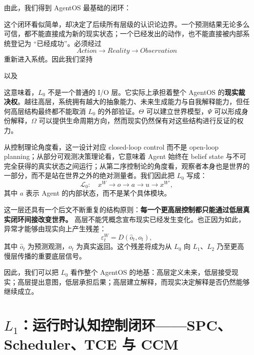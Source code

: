由此，我们得到 AgentOS 最基础的闭环：
\begin{statementbox}
\centering
{}
\end{statementbox}

这个闭环看似简单，却决定了后续所有层级的认识论边界。一个预测结果无论多么可信，都不能直接成为新的现实状态；一个已经发出的动作，也不能直接被内部系统登记为 ``已经成功''。必须经过
\[
Action
\rightarrow
Reality
\rightarrow
Observation
\]
重新进入系统。因此我们坚持
\begin{statementbox}
\centering
{}
\end{statementbox}
以及
\begin{statementbox}
\centering
{}
\end{statementbox}

这意味着，$L_0$ 不是一个普通的 I/O 层。它实际上承担着整个 AgentOS 的\textbf{现实裁决权}。越往高层，系统拥有越大的抽象能力、未来生成能力与自我解释能力，但任何高层结构最终都不能取消 $L_0$ 的外部验证。$\Theta$ 可以建立世界模型，$\Psi$ 可以形成身份解释，$\Omega$ 可以提供生命周期方向，然而现实仍然保有对这些结构进行反证的权力。

从控制理论角度看，这一设计对应 closed-loop control 而不是 open-loop planning；从部分可观测决策理论看，它意味着 Agent 始终在 belief state 与不可完全获得的真实状态之间运行；从第二序控制论的角度看，观察者本身也是世界的一部分，而不是站在世界之外的绝对测量者。我们因此把 $L_0$ 写成：
\[
\mathcal{L}_0:
\quad
x^W
\rightarrow
o
\rightarrow
a
\rightarrow
u
\rightarrow
x^{W\prime},
\]
其中 $a$ 表示 Agent 的内部状态，而不是某个具体模块。

这一层还具有一个后文不断重复的结构原则：\textbf{每一个更高层控制都只能通过低层真实闭环间接改变世界。} 高层不能凭概念宣布现实已经发生变化。也正因为如此，异常才能够由现实向上产生残差：
\[
\varepsilon^{W}_t
=
D
\left(
\hat{o}_t,
o_t
\right),
\]
其中 $\hat{o}_t$ 为预测观测，$o_t$ 为真实返回。这个残差将成为从 $L_0$ 向 $L_1$、$L_2$ 乃至更高慢层传播的重要底层信号。

因此，我们可以把 $L_0$ 看作整个 AgentOS 的地基：高层定义未来，低层接受现实；高层提出意图，低层承担后果；高层建立解释，而现实决定解释是否仍然能够继续成立。

\section{$L_1$：运行时认知控制闭环——SPC、Scheduler、TCE 与 CCM}

